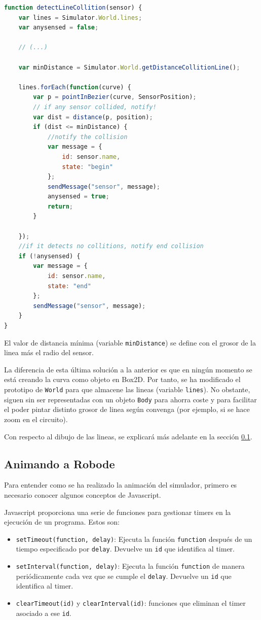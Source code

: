 \begin{lstlisting}[language={Javascript},label={code:deteccion-bezier}, caption={Función que detecta lineas (curvas de Bezier).}]
function detectLineCollition(sensor) {
	var lines = Simulator.World.lines;
	var anysensed = false;

	// (...)

	var minDistance = Simulator.World.getDistanceCollitionLine();

	lines.forEach(function(curve) {
		var p = pointInBezier(curve, SensorPosition);
		// if any sensor collided, notify!
		var dist = distance(p, position);
		if (dist <= minDistance) {
			//notify the collision
			var message = {
				id: sensor.name,
				state: "begin"
			};
			sendMessage("sensor", message);
			anysensed = true;
			return;
		}

	});
	//if it detects no collitions, notify end collision
	if (!anysensed) {
		var message = {
			id: sensor.name,
			state: "end"
		};
		sendMessage("sensor", message);
	}
}
\end{lstlisting}

El valor de distancia mínima (variable \texttt{minDistance}) se define con el grosor de la linea más el radio del sensor.

La diferencia de esta última solución a la anterior es que en ningún momento se está creando la curva como objeto en Box2D. Por tanto, se ha modificado el prototipo de \texttt{World} para que almacene las lineas (variable \texttt{lines}). No obstante, siguen sin ser representadas con un objeto \texttt{Body} para ahorra coste y para facilitar el poder pintar distinto grosor de linea según convenga (por ejemplo, si se hace zoom en el circuito).

Con respecto al dibujo de las lineas, se explicará más adelante en la sección \ref{animando-robode}.


\subsection{Animando a Robode}
\label{animando-robode}


Para entender como se ha realizado la animación del simulador, primero es necesario conocer algunos conceptos de Javascript.

Javascript proporciona una serie de funciones para gestionar timers en la ejecución de un programa. Estos son:

\begin{itemize}
	\item \texttt{setTimeout(function, delay)}: Ejecuta la función \texttt{function} después de un tiempo especificado por \texttt{delay}. Devuelve un \texttt{id} que identifica al timer.
	\item \texttt{setInterval(function, delay)}: Ejecuta la función \texttt{function} de manera periódicamente cada vez que se cumple el \texttt{delay}. Devuelve un \texttt{id} que identifica al timer.
	\item \texttt{clearTimeout(id)} y \texttt{clearInterval(id)}: funciones que eliminan el timer asociado a ese \texttt{id}.
\end{itemize}

